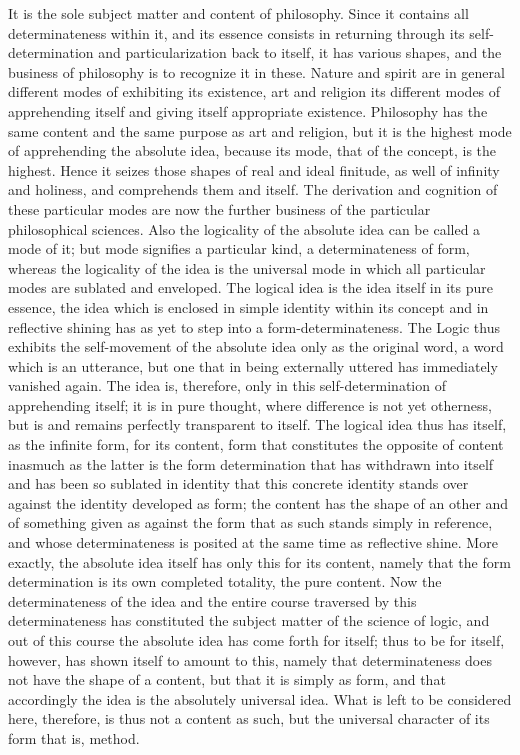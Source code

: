 It is the sole subject matter and content of philosophy.
Since it contains all determinateness within it,
and its essence consists in returning
through its self-determination
and particularization back to itself,
it has various shapes,
and the business of philosophy
is to recognize it in these.
Nature and spirit are in general
different modes of exhibiting its existence,
art and religion its different modes of apprehending itself
and giving itself appropriate existence.
Philosophy has the same content and the same
purpose as art and religion,
but it is the highest mode of apprehending the
absolute idea, because its mode, that of the concept, is the highest.
 Hence it seizes those shapes of real and ideal finitude, as well of infinity and
holiness, and comprehends them and itself.
The derivation and cognition
of these particular modes are now the further business of the particular
philosophical sciences.
Also the logicality of the absolute idea can be called a mode of it;
but mode signifies a particular kind,
a determinateness of form,
whereas the logicality of the idea is
the universal mode in which all particular modes are sublated and enveloped.
The logical idea is the idea itself in its pure essence,
the idea which is enclosed in simple identity within its concept
and in reflective shining has as yet to step into a form-determinateness.
The Logic thus exhibits the self-movement of the absolute idea
only as the original word, a word which is an utterance,
but one that in being externally uttered has immediately vanished again.
The idea is, therefore, only in this self-determination of apprehending itself;
it is in pure thought, where difference is not yet otherness,
but is and remains perfectly transparent to itself.
The logical idea thus has itself, as the infinite form,
for its content, form that constitutes the opposite of content inasmuch as
the latter is the form determination that has withdrawn into itself and has
been so sublated in identity that this concrete identity stands over against
the identity developed as form; the content has the shape of an other and of
something given as against the form that as such stands simply in reference,
and whose determinateness is posited at the same time as reflective shine.
More exactly, the absolute idea itself has only this for its content,
namely that the form determination is
its own completed totality, the pure content.
Now the determinateness of the idea
and the entire course traversed by this determinateness
has constituted the subject matter of the science of logic,
and out of this course the absolute idea has come forth for itself;
thus to be for itself, however, has shown itself to amount to this,
namely that determinateness does not have the shape of a content,
but that it is simply as form,
and that accordingly the idea is
the absolutely universal idea.
What is left to be considered here, therefore,
is thus not a content as such,
but the universal character of its form
that is, method.

